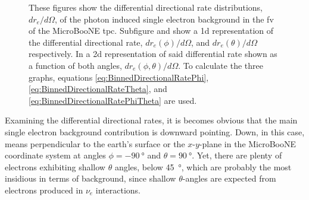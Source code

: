\begin{figure}[htbp]
    \caption[Differential Directional Rate Distributions of the Photon Induced Electron Background in Fiducial Volume]{These figures show the differential directional rate distributions, $dr_e/d\Omega$, of the photon induced single electron background in the \gls{fv} of the MicroBooNE \gls{tpc}. Subfigure  and  show a \gls{1d} representation of the differential directional rate, $dr_e(\phi)/d\Omega$, and $dr_e(\theta)/d\Omega$ respectively. In  a \gls{2d} representation of said differential rate shown as a function of both angles, \ie $dr_e(\phi,\theta)/d\Omega$. To calculate the three graphs, equations \ref{eq:BinnedDirectionalRatePhi}, \ref{eq:BinnedDirectionalRateTheta}, and \ref{eq:BinnedDirectionalRatePhiTheta} are used.}
    \label{fig:FiducialAngularBackground}
\end{figure}
Examining the differential directional rates, it is becomes obvious that the main single electron background contribution is downward pointing. Down, in this case, means perpendicular to the earth's surface or the $x$-$y$-plane in the MicroBooNE coordinate system at angles $\phi = \SI{-90}{\degree}$ and $\theta = \SI{90}{\degree}$. Yet, there are plenty of electrons exhibiting shallow $\theta$ angles, below \SI{45}{\degree}, which are probably the most insidious in terms of background, since shallow $\theta$-angles are expected from electrons produced in $\nu_e$ interactions.

